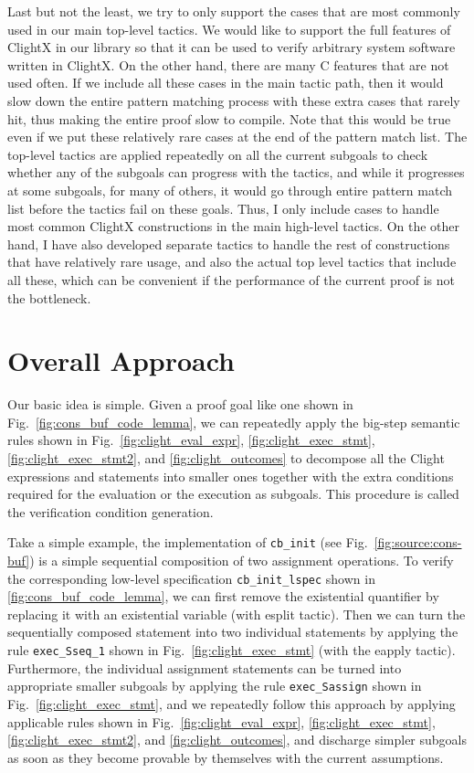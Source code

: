 Last but not the least, we try to only support the cases that are most commonly
used in our main top-level tactics. We would like to support the full
features of ClightX in our library so that it can be used to verify arbitrary
system software written in ClightX. On the other hand, there are many
C features that are not used often. If we include all these cases in the
main tactic path, then it would slow down the entire pattern matching process
with these extra cases that rarely hit, thus making the entire proof slow to compile.
Note that this would be true even if we put these relatively rare cases
at the end of the pattern match list. The top-level tactics are applied
repeatedly on all the current subgoals to check whether any of the subgoals
can progress with the tactics, and while it progresses at some subgoals, for
many of others, it would go through entire pattern match list before the tactics
fail on these goals. Thus, I only include cases to handle most common ClightX
constructions in the main high-level tactics.
On the other hand, I have also developed separate tactics to handle the rest
of constructions that have relatively rare usage, and also the actual top
level tactics that include all these, which can be convenient if the performance
of the current proof is not the bottleneck.


\section{Overall Approach}
\label{sec:approach}

Our basic idea is simple. Given a proof goal like one shown in Fig.~\ref{fig:cons_buf_code_lemma}, we can repeatedly apply the big-step
semantic rules shown in Fig.~\ref{fig:clight_eval_expr}, \ref{fig:clight_exec_stmt},
\ref{fig:clight_exec_stmt2}, and \ref{fig:clight_outcomes} to decompose all
the Clight expressions and statements into smaller ones together with
the extra conditions required for the evaluation or the execution as subgoals.
This procedure is called the verification condition generation. 

Take a simple example, the implementation of \texttt{cb\_init} (see
Fig.~\ref{fig:source:cons-buf}) is a simple sequential composition of
two assignment operations. To verify the corresponding low-level specification
\texttt{cb\_init\_lspec} shown in \ref{fig:cons_buf_code_lemma}, we can first
remove the existential quantifier by replacing it with an existential
variable (with \textsf{esplit} tactic). Then we can turn the sequentially
composed statement into two individual statements by applying the rule
\texttt{exec\_Sseq\_1} shown in Fig.~\ref{fig:clight_exec_stmt} (with
the \textsf{eapply} tactic). Furthermore, the individual assignment
statements can be turned into appropriate smaller subgoals
by applying the rule \texttt{exec\_Sassign} shown in
Fig.~\ref{fig:clight_exec_stmt}, and we repeatedly follow this approach
by applying applicable rules shown in Fig.~\ref{fig:clight_eval_expr},
\ref{fig:clight_exec_stmt}, \ref{fig:clight_exec_stmt2}, and
\ref{fig:clight_outcomes}, and discharge simpler subgoals as soon as
they become provable by themselves with the current assumptions.

